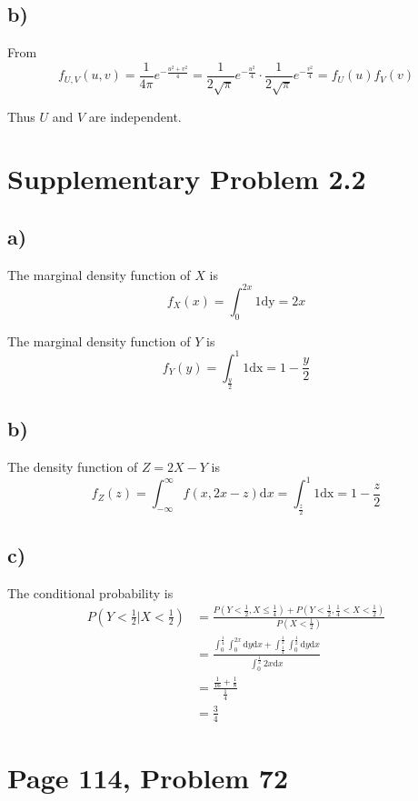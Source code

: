\documentclass[a4paper, UTF-8]{article}
\theoremstyle{plain}
\begin{document}
\subsection{b)} 

From 
$$
f_{U, V}(u, v) = \frac{1}{4\pi}e^{-\frac{u^2 + v^2}{4}} = \frac{1}{2\sqrt{\pi}}e^{-\frac{u^2}{4}} \cdot \frac{1}{2\sqrt{\pi}}e^{-\frac{v^2}{4}} = f_U(u)f_V(v)
$$

Thus $U$ and $V$ are independent.

\section{Supplementary Problem 2.2} 

\subsection{a)}

The marginal density function of $X$ is 
$$
f_X(x) = \int_{0}^{2x} 1 \mathrm{dy} = 2x
$$

The marginal density function of $Y$ is 
$$
f_Y(y) = \int_{\frac{y}{2}}^1 1 \mathrm{dx} = 1 - \frac{y}{2}
$$

\subsection{b)} 

The density function of $Z = 2X - Y$ is
$$
f_Z(z) = \int_{-\infty}^\infty f(x, 2x - z) \mathrm{d}x = \int_{\frac{z}{2}}^1 1 \mathrm{dx} = 1 - \frac{z}{2}
$$

\subsection{c)} 

The conditional probability is 
\begin{align*}
P(Y < \frac{1}{2}|X < \frac{1}{2}) &= \frac{P(Y < \frac{1}{2}, X \leq \frac{1}{4}) + P(Y < \frac{1}{2},  \frac{1}{4} < X < \frac{1}{2})}{P(X < \frac{1}{2})} \\ 
&= \frac{\int_{0}^\frac{1}{4} \int_{0}^{2x} \mathrm{d}y \mathrm{d}x + \int_{\frac{1}{4}}^{\frac{1}{2}} \int_{0}^\frac{1}{2} \mathrm{d}y\mathrm{d}x}{\int_{0}^{\frac{1}{2}} 2x \mathrm{d}x} \\ 
&= \frac{\frac{1}{16} + \frac{1}{8}}{\frac{1}{4}}  \\ 
&= \frac{3}{4}
\end{align*}

\section{Page 114, Problem 72}
\end{document}
